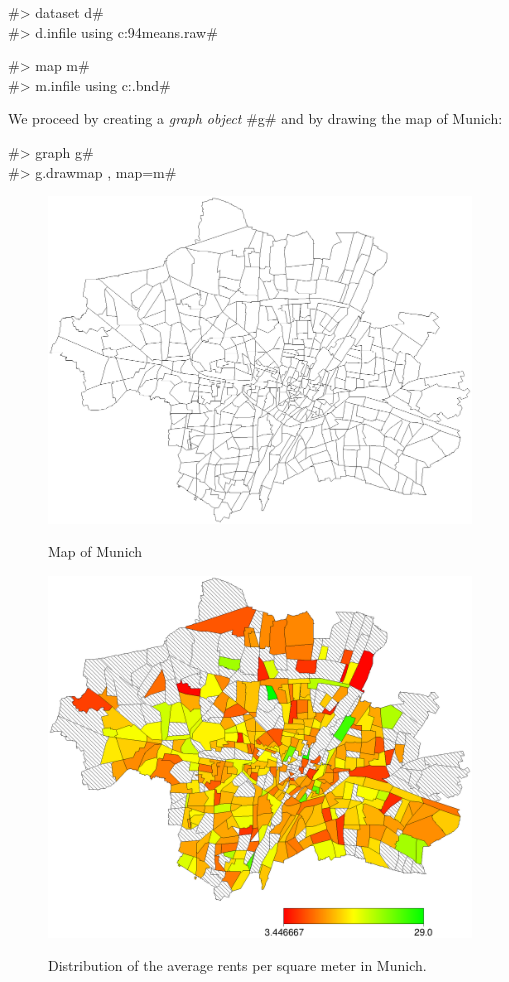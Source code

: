 #> dataset d# \\
#> d.infile using c:\bayesx\examples\rent94means.raw#

#> map m# \\
#> m.infile using c:\bayesx\examples\munich.bnd#

We proceed by creating a {\em graph object} #g# and by drawing the map of Munich:

#> graph g# \\
#> g.drawmap , map=m#

\begin{figure}[htb]
\begin{center}
\includegraphics[scale=0.5]{grafiken/munichdrawmap.ps}
{\em\caption{ \label{munichdrawmap} Map of Munich}}
\end{center}
\end{figure}

\begin{figure}[htb]
\begin{center}
\includegraphics[scale=0.5]{grafiken/munichmeansdrawmap.ps}
{\em\caption{ \label{munichmeans} Distribution of the average
rents per square meter in Munich.}}
\end{center}
\end{figure}

